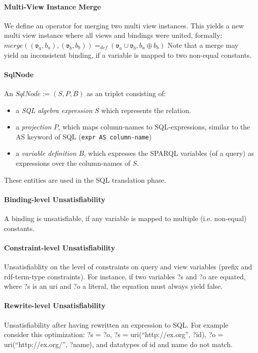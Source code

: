 \documentclass[a4paper,twoside,bibtotoc,abstracton,12pt,BCOR=15mm]{scrreprt}
\newcommand{\todo}[1]{\textbf{ToDo: \textit{#1}}}
\begin{document}
\paragraph{Multi-View Instance Merge}
We define an operator for merging two multi view instances. 
This yields a new multi view instance where all views and bindings were united, formally: 
$merge((\mathfrak{v}_a, b_a), (\mathfrak{v}_b, b_b)) =_{def} (\mathfrak{v}_a \cup \mathfrak{v}_b, b_a \oplus b_b)$
Note that a merge may yield an inconsistent binding, if a variable is mapped to two non-equal constants.

\paragraph{SqlNode}
An $SqlNode := (S, P, B)$ as an triplet consisting of:
\begin{itemize}
  \item a \emph{SQL algebra expression} $S$ which represents the relation.
  \item a \emph{projection} $P$, which maps column-names to SQL-expressions, similar to the AS keyword of SQL (\texttt{expr AS column-name})
  \item a \emph{variable definition} $B$, which expresses the SPARQL variables (of a query) as expressions over the column-names of $S$.
\end{itemize}
These entities are used in the SQL translation phase. 


\paragraph{Binding-level Unsatisfiability}
A binding is unsatisfiable, if any variable is mapped to multiple (i.e. non-equal) constants.

\paragraph{Constraint-level Unsatisfiability}
Unsatisfiablity on the level of constraints on query and view variables (prefix and rdf-term-type constraints).
For instance, if two variables ?s and ?o are equated, where ?s is an uri and ?o a literal, the equation must always yield false.

\paragraph{Rewrite-level Unsatisfiability}
Unsatisfiability after having rewritten an expression to SQL.
For example consider this optimization: ?s = ?o, ?s = uri(``http://ex.org'', ?id), ?o = uri(``http://ex.org/'', ?name), and datatypes of
 id and name do not match. 
\end{document}
